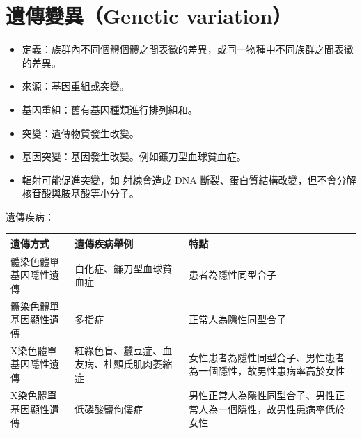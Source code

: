 \documentclass[a4paper,12pt]{report}
\begin{document}
\section{遺傳變異（Genetic variation）}
\begin{itemize}
\item 定義：族群內不同個體個體之間表徵的差異，或同一物種中不同族群之間表徵的差異。
\item 來源：基因重組或突變。
\item 基因重組：舊有基因種類進行排列組和。
\item 突變：遺傳物質發生改變。
\item 基因突變：基因發生改變。例如鐮刀型血球貧血症。
\item 輻射可能促進突變，如 \tx{\textgamma} 射線會造成 DNA 斷裂、蛋白質結構改變，但不會分解核苷酸與胺基酸等小分子。
\end{itemize}
遺傳疾病：
\begin{longtable}[c]{|p{0.25\tw}|p{0.25\tw}|p{0.3\tw}|}
\hline
遺傳方式 & 遺傳疾病舉例 & 特點 \\ \hline
體染色體單基因隱性遺傳 & 白化症、鐮刀型血球貧血症 & 患者為隱性同型合子 \\ \hline
體染色體單基因顯性遺傳 & 多指症 & 正常人為隱性同型合子 \\ \hline
X染色體單基因隱性遺傳 & 紅綠色盲、蠶豆症、血友病、杜顯氏肌肉萎縮症 & 女性患者為隱性同型合子、男性患者為一個隱性，故男性患病率高於女性 \\ \hline
X染色體單基因顯性遺傳 & 低磷酸鹽佝僂症 & 男性正常人為隱性同型合子、男性正常人為一個隱性，故男性患病率低於女性 \\ \hline
\end{longtable}
\end{document}
